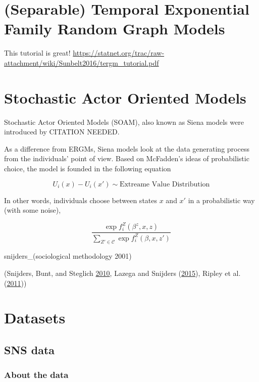 \documentclass[]{book}
\theoremstyle{definition}
\theoremstyle{definition}
\theoremstyle{definition}
\theoremstyle{remark}
\begin{document}
\chapter{(Separable) Temporal Exponential Family Random Graph
Models}\label{separable-temporal-exponential-family-random-graph-models}

This tutorial is great!
\url{https://statnet.org/trac/raw-attachment/wiki/Sunbelt2016/tergm_tutorial.pdf}

\chapter{Stochastic Actor Oriented
Models}\label{stochastic-actor-oriented-models}

Stochastic Actor Oriented Models (SOAM), also known as Siena models were
introduced by CITATION NEEDED.

As a difference from ERGMs, Siena models look at the data generating
process from the individuals' point of view. Based on McFadden's ideas
of probabilistic choice, the model is founded in the following equation

\[
U_i(x) - U_i(x') \sim \mbox{Extreame Value Distribution}
\]

In other words, individuals choose between states \(x\) and \(x'\) in a
probabilistic way (with some noise),

\[
\frac{\exp{f_i^Z(\beta^z,x, z)}}{\sum_{Z'\in\mathcal{C}}\exp{f_i^{Z}(\beta, x, z')}}
\]

snijders\_(sociological methodology 2001)

(Snijders, Bunt, and Steglich
\protect\hyperlink{ref-Snijders2010}{2010}, Lazega and Snijders
(\protect\hyperlink{ref-lazega2015}{2015}), Ripley et al.
(\protect\hyperlink{ref-Ripley2011}{2011}))

\cleardoublepage 

\appendix


\chapter{Datasets}\label{datasets}

\hypertarget{sns-data}{\section{SNS data}\label{sns-data}}

\subsection{About the data}\label{about-the-data}
\end{document}
